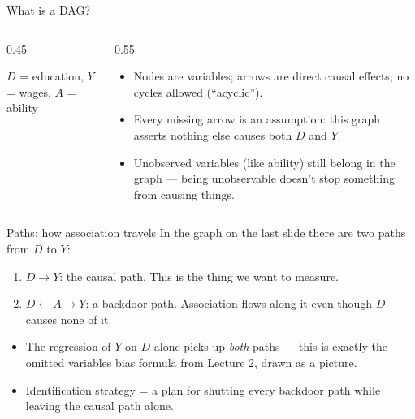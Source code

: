 \documentclass[aspectratio=169,11pt]{beamer}
\begin{document}
\begin{frame}{What is a DAG?}
\begin{columns}
\begin{column}{0.45\textwidth}
\begin{center}
\end{center}
\smallskip
{\small $D$ = education, $Y$ = wages, $A$ = ability}
\end{column}
\begin{column}{0.55\textwidth}
\begin{itemize}
	\item Nodes are variables; arrows are direct causal effects; no cycles allowed
	(``acyclic'').

	\item Every \alert{missing arrow is an assumption}: this graph asserts nothing
	else causes both $D$ and $Y$.

	\item Unobserved variables (like ability) still belong in the graph --- being
	unobservable doesn't stop something from causing things.
\end{itemize}
\end{column}
\end{columns}
\end{frame}


\begin{frame}{Paths: how association travels}
In the graph on the last slide there are two paths from $D$ to $Y$:
\begin{enumerate}
	\item $D \rightarrow Y$: the \alert{causal path}. This is the thing we want to measure.
	\item $D \leftarrow A \rightarrow Y$: a \alert{backdoor path}. Association flows
	along it even though $D$ causes none of it.
\end{enumerate}
\bigskip
\begin{itemize}
	\item The regression of $Y$ on $D$ alone picks up \emph{both} paths --- this is
	exactly the omitted variables bias formula from Lecture 2, drawn as a picture.

	\medskip
	\item \alert{Identification strategy = a plan for shutting every backdoor path
	while leaving the causal path alone.}
\end{itemize}
\end{frame}
\end{document}
